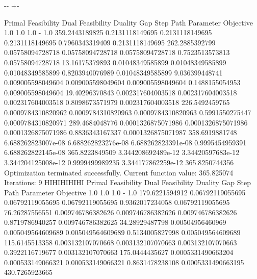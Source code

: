 \documentclass[letterpaper,10pt,english]{sphinxmanual}
\newlength\nbsphinxcodecellspacing
\begin{document}
{

\kern-\sphinxverbatimsmallskipamount\kern-\baselineskip
\kern+\FrameHeightAdjust\kern-\fboxrule
\vspace{\nbsphinxcodecellspacing}

\begin{sphinxVerbatim}[commandchars=\\\{\}]
Primal Feasibility  Dual Feasibility    Duality Gap         Step             Path Parameter      Objective
1.0                 1.0                 1.0                 -                1.0                 359.2443189825
0.2131118149695     0.2131118149695     0.2131118149695     0.7960343319409  0.2131118149695     262.2885392799
0.05758094728718    0.05758094728718    0.05758094728718    0.7523513573813  0.05758094728718    13.16175379893
0.01048349585899    0.01048349585899    0.01048349585899    0.8203940076989  0.01048349585899    9.036399448741
0.009005598049604   0.009005598049604   0.009005598049604   0.1488155054953  0.009005598049604   19.40296370843
0.002317604003518   0.002317604003518   0.002317604003518   0.8098673571979  0.002317604003518   226.5492459765
0.0009784310820962  0.0009784310820963  0.0009784310820963  0.5991550275447  0.0009784310820971  289.4684048776
0.0001326875071986  0.0001326875071986  0.0001326875071986  0.8836343167337  0.0001326875071987  358.6919881748
6.688262823007e-08  6.688262823276e-08  6.688262823391e-08  0.9995454959391  6.688262822145e-08  365.8223849509
3.344208692489e-12  3.34420597683e-12   3.344204125008e-12  0.9999499989235  3.344177862259e-12  365.8250744356
Optimization terminated successfully.
         Current function value: 365.825074
         Iterations: 9
HIHIHIHIHI
Primal Feasibility  Dual Feasibility    Duality Gap         Step             Path Parameter      Objective
1.0                 1.0                 1.0                 -                1.0                 179.6221594912
0.06792119055695    0.06792119055695    0.06792119055695    0.9362017234058  0.06792119055695    76.26287556551
0.009746786382626   0.009746786382626   0.009746786382626   0.8719786940257  0.009746786382625   34.28929487798
0.00504956460969    0.005049564609689   0.005049564609689   0.5134005827998  0.005049564609689   115.6145513358
0.003132107070668   0.003132107070663   0.003132107070663   0.3922116719677  0.003132107070663   175.0444435627
0.0005331490663204  0.000533149066321   0.000533149066321   0.8631478238108  0.0005331490663195  430.7265923665

\end{sphinxVerbatim}}
\end{document}
